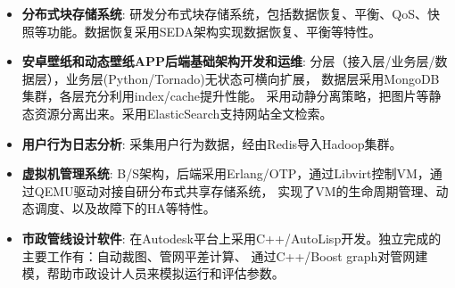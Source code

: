   \begin{itemize}[leftmargin=*]
    \item \textbf{分布式块存储系统}: 研发分布式块存储系统，包括数据恢复、平衡、QoS、快照等功能。数据恢复采用SEDA架构实现数据恢复、平衡等特性。

    \item \textbf{安卓壁纸和动态壁纸APP后端基础架构开发和运维}: 分层（接入层/业务层/数据层），业务层(Python/Tornado)无状态可横向扩展，
        数据层采用MongoDB集群，各层充分利用index/cache提升性能。
        采用动静分离策略，把图片等静态资源分离出来。采用ElasticSearch支持网站全文检索。

    \item \textbf{用户行为日志分析}: 采集用户行为数据，经由Redis导入Hadoop集群。

    \item \textbf{虚拟机管理系统}: B/S架构，后端采用Erlang/OTP，通过Libvirt控制VM，通过QEMU驱动对接自研分布式共享存储系统，
        实现了VM的生命周期管理、动态调度、以及故障下的HA等特性。

    \item \textbf{市政管线设计软件}: 在Autodesk平台上采用C++/AutoLisp开发。独立完成的主要工作有：自动裁图、管网平差计算、
        通过C++/Boost graph对管网建模，帮助市政设计人员来模拟运行和评估参数。
  \end{itemize}
